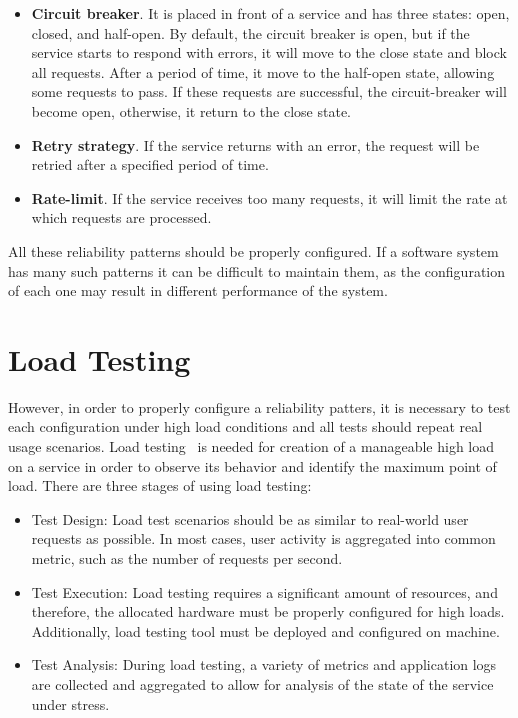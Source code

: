 \begin{itemize}
\item \textbf{Circuit breaker}. It is placed in front of a service and has three states: open, closed, and half-open. By default, the circuit breaker is open, but if the service starts to respond with errors, it will move to the close state and block all requests. After a period of time, it move to the half-open state, allowing some requests to pass. If these requests are successful, the circuit-breaker will become open, otherwise, it return to the close state.
\item \textbf{Retry strategy}. If the service returns with an error, the request will be retried after a specified period of time.
\item \textbf{Rate-limit}. If the service receives too many requests, it will limit the rate at which requests are processed.
\end{itemize}

All these reliability patterns should be properly configured. If a software system has many such patterns it can be difficult to maintain them, as the configuration of each one may result in different performance of the system.

\section{Load Testing}\label{sec:load-testing}
However, in order to properly configure a reliability patters, it is necessary to test each configuration under high load conditions and all tests should repeat real usage scenarios. Load testing~\cite{load_testing_wiki} is needed for creation of a manageable high load on a service in order to observe its behavior and identify the maximum point of load. There are three stages of using load testing:

\begin{itemize}
\item Test Design: Load test scenarios should be as similar to real-world user requests as possible. In most cases, user activity is aggregated into common metric, such as the number of requests per second.
\item Test Execution: Load testing requires a significant amount of resources, and therefore, the allocated hardware must be properly configured for high loads. Additionally, load testing tool must be deployed and configured on machine.
\item Test Analysis: During load testing, a variety of metrics and application logs are collected and aggregated to allow for analysis of the state of the service under stress.
\end{itemize}

